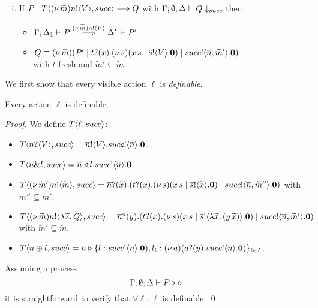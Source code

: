 \begin{definition}[Definibility]
\begin{enumerate}
\begin{enumerate}[i.]
				\item	If $P \;|\; T\langle (\nu\, \widetilde{m})n ! \langle V \rangle, succ \rangle \longrightarrow Q$
						with $\Gamma; \emptyset; \Delta \vdash Q \downarrow_{succ}$ then 
						\begin{itemize}
							\item $\Gamma; \Delta_1 \vdash P \stackrel{(\nu\, \widetilde{m})n ! \langle V \rangle}{\Longrightarrow} \Delta_1' \vdash P'$
						\item $Q \equiv (\nu\, \widetilde{m})(P' \;|\; t ? (x) . (\nu\, s)(x\, {s} \;|\; \overline{s} ! \langle V \rangle . \mathbf{0}) \;|\; succ ! \langle \overline{n}, \widetilde{m}' \rangle . \mathbf{0})$ \\
						with $t$ fresh and $\widetilde{m}' \subseteq \widetilde{m}$.
						\end{itemize}
			\end{enumerate}
	\end{enumerate}	
%
\end{definition}

We first show that every visible action $\ell$ is {\em definable}.

\begin{lemma}[Definibility]
	\label{lem:definibility}
	Every action $\ell$ is definable.
\end{lemma}

\begin{proof}
	\noi We define $T\langle \ell, succ \rangle$:
%
	\begin{itemize}
		\item	$T\langle n ? \langle V \rangle, succ \rangle = \overline{n} ! \langle V \rangle . succ ! \langle \overline{n} \rangle . \mathbf{0}$.

		\item	$T\langle n \& l, succ \rangle = \overline{n} \triangleleft l . succ ! \langle \overline{n} \rangle . \mathbf{0}$.


		\item	$T\langle (\nu\, \widetilde{m}') n ! \langle \widetilde{m} \rangle, succ \rangle = \overline{n} ? (\widetilde{x}) . (t ? (x) . (\nu\, s)(x\, {s} \;|\; \overline{s} ! \langle \widetilde{x} \rangle . \mathbf{0}) \;|\; succ ! \langle \overline{n}, \widetilde{m}'' \rangle . \mathbf{0})$
			with $\widetilde{m}'' \subseteq \widetilde{m}'$.

		\item	$T\langle (\nu\, \widetilde{m}) n ! \langle \lambda \widetilde{x}.\,Q \rangle, succ \rangle = \overline{n} ? (y) . (t ? (x) . (\nu\, s)(x\, {s} \;|\; \overline{s} ! \langle \lambda \widetilde{x}.\,(y\, {\widetilde{x}}) \rangle . \mathbf{0}) \;|\; succ ! \langle \overline{n}, \widetilde{m}' \rangle . \mathbf{0})$ with $\widetilde{m}' \subseteq \widetilde{m}$.

		\item	$T\langle n \oplus l, succ \rangle = \overline{n} \triangleright \{l: succ ! \langle \overline{n} \rangle . \mathbf{0}), l_i: (\nu\, a)(a ? (y) . succ ! \langle \overline{n} \rangle . \mathbf{0})\}_{i \in I}$.
	\end{itemize}

	\noi Assuming a process 
	\[
		\Gamma; \emptyset; \Delta \vdash P \triangleright \diamond
	\] 
	\noi it is straightforward to verify that $\forall \ell$, $\ell$ is definable.
	\qed
\end{proof}

